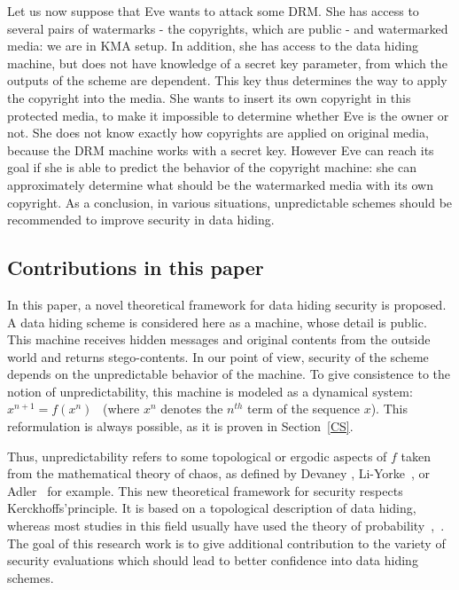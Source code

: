 \documentclass{llncs}
\begin{document}
Let us now suppose that Eve wants to attack some DRM. She has access to several pairs of watermarks - the copyrights, which are public - and watermarked media: we are in KMA setup. In addition, she has access to the data hiding machine, but does not have knowledge of a secret key parameter, from which the outputs of the scheme are dependent. This key thus determines the way to apply the copyright into the media. She wants to insert its own copyright in this protected media, to make it impossible to determine whether Eve is the owner or not. She does not know exactly how copyrights are applied on original media, because the DRM machine works with a secret key. However Eve can reach its goal if she is able to predict the behavior of the copyright machine: she can approximately determine what should be the watermarked media with its own copyright. As a conclusion, in various situations, unpredictable schemes should be recommended to improve security in data hiding. 



\subsection{Contributions in this paper}
\label{contrib}
In this paper, a novel theoretical framework for data hiding security is proposed. A data hiding scheme is considered here as a machine, whose detail is public. This machine receives hidden messages and original contents from the outside world and returns stego-contents. In our point of view, security of the scheme depends on the unpredictable behavior of the machine. To give consistence to the notion of unpredictability, this machine is modeled as a dynamical system: $x^{n+1}=f(x^{n})$ ~(where $x^n$ denotes the $n^{th}$ term of the sequence $x$). This reformulation is always possible, as it is proven in Section~\ref{CS}. 


Thus, unpredictability refers to some topological or ergodic aspects of $f$ taken from the mathematical theory of chaos, as defined by Devaney \cite{Devaney}, Li-Yorke~\cite{Li75}, or Adler~\cite{Adler65} for example. This new theoretical framework for security respects Kerckhoffs'principle. It is based on a topological description of data hiding, whereas most studies in this field usually have used the theory of probability~\cite{Perez-Freire06},~\cite{Furon05}. The goal of this research work is to give additional contribution to the variety of security evaluations which should lead to better confidence into data hiding schemes.
\end{document}
